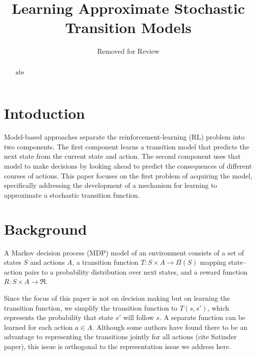 \documentclass[letterpaper]{article} %
\begin{document}
%
\title{Learning Approximate Stochastic Transition Models}
\author{Removed for Review}
\maketitle
\begin{abstract}
abs
\end{abstract}

\section{Intoduction}

Model-based approaches separate the reinforcement-learning (RL) problem into two components. The first component learns a transition model that predicts the next state from the current state and action. The second component uses that model to make decisions by looking ahead to predict the consequences of different courses of actions. This paper focuses on the first problem of acquiring the model, specifically addressing the development of a mechanism for learning to approximate a stochastic transition function.

\section{Background}

A Markov decision process (MDP) model of an environment consists of a set of states $S$ and actions $A$, a transition function $T:S\times A \rightarrow \Pi(S)$ mapping state--action pairs to a probability distribution over next states, and a reward function $R:S\times A \rightarrow \Re$.

Since the focus of this paper is not on decision making but on learning the transition function, we simplify the transition function to $T(s,s')$, which represents the probability that state $s'$ will follow $s$. A separate function can be learned for each action $a\in A$. Although some authors have found there to be an advantage to representing the transitions jointly for all actions (cite Satinder paper), this issue is orthogonal to the representation issue we address here.
\end{document}
